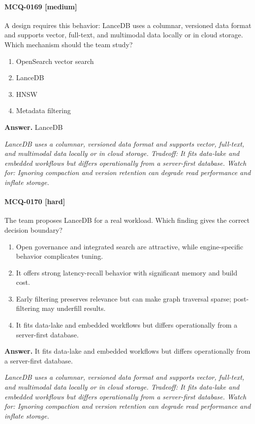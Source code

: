 \paragraph{MCQ-0169 [medium]} A design requires this behavior: LanceDB uses a columnar, versioned data format and supports vector, full-text, and multimodal data locally or in cloud storage. Which mechanism should the team study?
\begin{enumerate}[label=\Alph*.]
\item OpenSearch vector search
\item LanceDB
\item HNSW
\item Metadata filtering
\end{enumerate}
\noindent\textbf{Answer.} LanceDB
\par\textit{LanceDB uses a columnar, versioned data format and supports vector, full-text, and multimodal data locally or in cloud storage. Tradeoff: It fits data-lake and embedded workflows but differs operationally from a server-first database. Watch for: Ignoring compaction and version retention can degrade read performance and inflate storage.}
\paragraph{MCQ-0170 [hard]} The team proposes LanceDB for a real workload. Which finding gives the correct decision boundary?
\begin{enumerate}[label=\Alph*.]
\item Open governance and integrated search are attractive, while engine-specific behavior complicates tuning.
\item It offers strong latency-recall behavior with significant memory and build cost.
\item Early filtering preserves relevance but can make graph traversal sparse; post-filtering may underfill results.
\item It fits data-lake and embedded workflows but differs operationally from a server-first database.
\end{enumerate}
\noindent\textbf{Answer.} It fits data-lake and embedded workflows but differs operationally from a server-first database.
\par\textit{LanceDB uses a columnar, versioned data format and supports vector, full-text, and multimodal data locally or in cloud storage. Tradeoff: It fits data-lake and embedded workflows but differs operationally from a server-first database. Watch for: Ignoring compaction and version retention can degrade read performance and inflate storage.}
